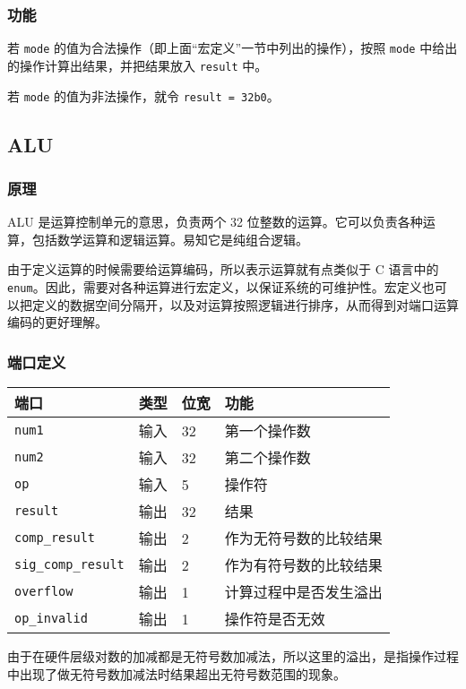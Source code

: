 \hypertarget{ux529fux80fd-6}{%
\subsubsection{功能}\label{ux529fux80fd-6}}

若 \texttt{mode}
的值为合法操作（即上面``宏定义''一节中列出的操作），按照 \texttt{mode}
中给出的操作计算出结果，并把结果放入 \texttt{result} 中。

若 \texttt{mode} 的值为非法操作，就令
\texttt{result\ =\ 32\textquotesingle{}b0}。

\hypertarget{alu}{%
\subsection{ALU}\label{alu}}

\hypertarget{ux539fux7406-3}{%
\subsubsection{原理}\label{ux539fux7406-3}}

ALU 是运算控制单元的意思，负责两个 32
位整数的运算。它可以负责各种运算，包括数学运算和逻辑运算。易知它是纯组合逻辑。

由于定义运算的时候需要给运算编码，所以表示运算就有点类似于 C 语言中的
\texttt{enum}。因此，需要对各种运算进行宏定义，以保证系统的可维护性。宏定义也可以把定义的数据空间分隔开，以及对运算按照逻辑进行排序，从而得到对端口运算编码的更好理解。

\hypertarget{ux7aefux53e3ux5b9aux4e49-3}{%
\subsubsection{端口定义}\label{ux7aefux53e3ux5b9aux4e49-3}}

\begin{longtable}[]{@{}llll@{}}
\toprule
端口 & 类型 & 位宽 & 功能\tabularnewline
\midrule
\endhead
\texttt{num1} & 输入 & 32 & 第一个操作数\tabularnewline
\texttt{num2} & 输入 & 32 & 第二个操作数\tabularnewline
\texttt{op} & 输入 & 5 & 操作符\tabularnewline
\texttt{result} & 输出 & 32 & 结果\tabularnewline
\texttt{comp\_result} & 输出 & 2 & 作为无符号数的比较结果\tabularnewline
\texttt{sig\_comp\_result} & 输出 & 2 &
作为有符号数的比较结果\tabularnewline
\texttt{overflow} & 输出 & 1 & 计算过程中是否发生溢出\tabularnewline
\texttt{op\_invalid} & 输出 & 1 & 操作符是否无效\tabularnewline
\bottomrule
\end{longtable}

由于在硬件层级对数的加减都是无符号数加减法，所以这里的溢出，是指操作过程中出现了做无符号数加减法时结果超出无符号数范围的现象。

